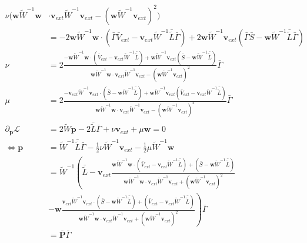 \begin{align}
    \nu(\mathbf{w}\tilde W^{-1}\mathbf{w} & \cdot\mathbf{v}_{ext}\tilde W^{-1}\mathbf{v}_{ext}-(\mathbf{w}\tilde W^{-1}\mathbf{v}_{ext})^2 )\\
    &= -2\mathbf{w}\tilde W^{-1}\mathbf{w}\cdot\left(\bar\Gamma \bar{V}_{ext} - \mathbf{v}_{ext}\tilde W^{-1}\bar {\tilde L} \bar\Gamma\right)+2\mathbf{w}\tilde W^{-1}\mathbf{v}_{ext}\left(\bar\Gamma\bar S - \mathbf{w}\tilde W^{-1}\bar {\tilde L} \bar\Gamma\right)\\
    \nu&= 2\frac{-\mathbf{w}\tilde W^{-1}\mathbf{w}\cdot\left(\bar{V}_{ext} - \mathbf{v}_{ext}\tilde W^{-1}\bar {\tilde L}\right)+\mathbf{w}\tilde W^{-1}\mathbf{v}_{ext}\left(\bar S - \mathbf{w}\tilde W^{-1}\bar {\tilde L}\right)}{\mathbf{w}\tilde W^{-1}\mathbf{w}\cdot\mathbf{v}_{ext}\tilde W^{-1}\mathbf{v}_{ext}-(\mathbf{w}\tilde W^{-1}\mathbf{v}_{ext})^2}\bar\Gamma\\
    \mu&= 2\frac{-\mathbf{v}_{ext}\tilde W^{-1}\mathbf{v}_{ext}\cdot\left(\bar S - \mathbf{w}\tilde W^{-1}\bar {\tilde L} \right)+\mathbf{w}\tilde W^{-1}\mathbf{v}_{ext}\left( \bar{V}_{ext}- \mathbf{v}_{ext}\tilde W^{-1}\bar {\tilde L} \right)}{\mathbf{w}\tilde W^{-1}\mathbf{w}\cdot\mathbf{v}_{ext}\tilde W^{-1}\mathbf{v}_{ext}-(\mathbf{w}\tilde W^{-1}\mathbf{v}_{ext})^2}\bar\Gamma\\
    \partial_{\mathbf p}\mathcal L&= 2\tilde{W} \mathbf{p}- 2 \bar {\tilde L} \bar\Gamma + \nu\mathbf{v}_{ext}+\mu \mathbf{w}= 0\\
    \Leftrightarrow\mathbf{p} &= \tilde W^{-1}\bar {\tilde L} \bar\Gamma - \frac{1}{2}\nu\tilde W^{-1}\mathbf{v}_{ext}-\frac{1}{2}\mu \tilde W^{-1}\mathbf{w}\\
    &= \tilde W^{-1}\left(\bar {\tilde L} - \mathbf{v}_{ext}\frac{\mathbf{w}\tilde W^{-1}\mathbf{w}\cdot\left(\bar{V}_{ext} - \mathbf{v}_{ext}\tilde W^{-1}\bar {\tilde L}\right)+\left(\bar S - \mathbf{w}\tilde W^{-1}\bar {\tilde L}\right)}{\mathbf{w}\tilde W^{-1}\mathbf{w}\cdot\mathbf{v}_{ext}\tilde W^{-1}\mathbf{v}_{ext}+(\mathbf{w}\tilde W^{-1}\mathbf{v}_{ext})^2}\right. \\
    &\left. -\mathbf{w}\frac{\mathbf{v}_{ext}\tilde W^{-1}\mathbf{v}_{ext}\cdot\left(\bar S - \mathbf{w}\tilde W^{-1}\bar {\tilde L} \right)+\left( \bar{V}_{ext}- \mathbf{v}_{ext}\tilde W^{-1}\bar {\tilde L} \right)}{\mathbf{w}\tilde W^{-1}\mathbf{w}\cdot\mathbf{v}_{ext}\tilde W^{-1}\mathbf{v}_{ext}+(\mathbf{w}\tilde W^{-1}\mathbf{v}_{ext})^2}\right)\bar\Gamma\\
    &= \bar{\mathbf{P}}\bar\Gamma\\
    \end{align}
